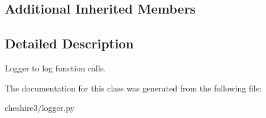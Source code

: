 \subsection*{Additional Inherited Members}


\subsection{Detailed Description}
\begin{DoxyVerb}Logger to log function calls.\end{DoxyVerb}
 

The documentation for this class was generated from the following file\-:\begin{DoxyCompactItemize}
\item 
cheshire3/logger.\-py\end{DoxyCompactItemize}
